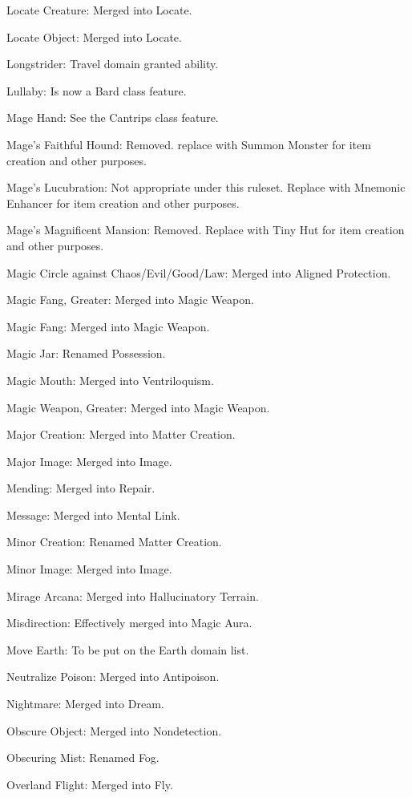 {\begin{list}{}{\leftmargin=1em}
 \item Locate Creature: Merged into Locate.
 \item Locate Object: Merged into Locate.
 \item Longstrider: Travel domain granted ability.
 \item Lullaby: Is now a Bard class feature.
 \item Mage Hand: See the Cantrips class feature.
 \item Mage's Faithful Hound: Removed. replace with Summon Monster for item creation and other purposes.
 \item Mage's Lucubration: Not appropriate under this ruleset. Replace with Mnemonic Enhancer for item creation and other purposes.
 \item Mage's Magnificent Mansion: Removed. Replace with Tiny Hut for item creation and other purposes.
 \item Magic Circle against Chaos/Evil/Good/Law: Merged into Aligned Protection.
 \item Magic Fang, Greater: Merged into Magic Weapon.
 \item Magic Fang: Merged into Magic Weapon.
 \item Magic Jar: Renamed Possession.
 \item Magic Mouth: Merged into Ventriloquism.
 \item Magic Weapon, Greater: Merged into Magic Weapon.
 \item Major Creation: Merged into Matter Creation.
 \item Major Image: Merged into Image.
 \item Mending: Merged into Repair.
 \item Message: Merged into Mental Link.
 \item Minor Creation: Renamed Matter Creation.
 \item Minor Image: Merged into Image.
 \item Mirage Arcana: Merged into Hallucinatory Terrain.
 \item Misdirection: Effectively merged into Magic Aura.
 \item Move Earth: To be put on the Earth domain list.
 \item Neutralize Poison: Merged into Antipoison.
 \item Nightmare: Merged into Dream.
 \item Obscure Object: Merged into Nondetection.
 \item Obscuring Mist: Renamed Fog.
 \item Overland Flight: Merged into Fly.

\end{list}}
